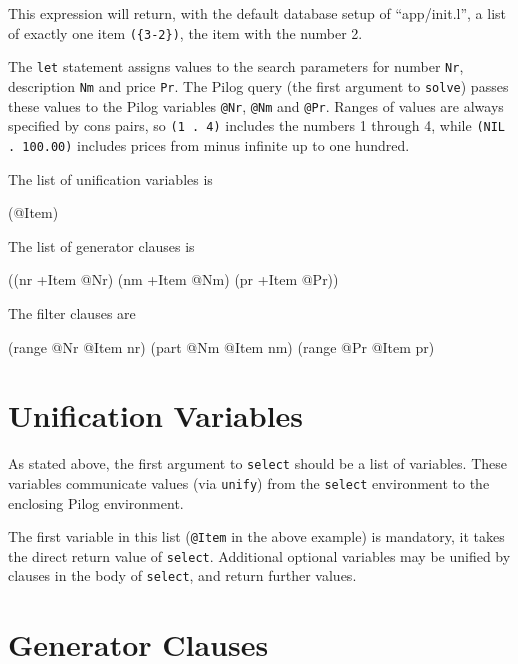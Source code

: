 This expression will return, with the default database setup of
``app/init.l'', a list of exactly one item \texttt{(\{3-2\})}, the item with the
number 2.

The \texttt{let} statement assigns values to the search parameters for number
\texttt{Nr}, description \texttt{Nm} and price \texttt{Pr}. The Pilog query (the first
argument to \texttt{solve}) passes these values to the Pilog variables \texttt{@Nr},
\texttt{@Nm} and \texttt{@Pr}. Ranges of values are always specified by cons pairs, so
\texttt{(1 . 4)} includes the numbers 1 through 4, while \texttt{(NIL . 100.00)}
includes prices from minus infinite up to one hundred.

The list of unification variables is


\begin{wideverbatim}
(@Item)
\end{wideverbatim}

The list of generator clauses is


\begin{wideverbatim}
((nr +Item @Nr) (nm +Item @Nm) (pr +Item @Pr))
\end{wideverbatim}

The filter clauses are


\begin{wideverbatim}
(range @Nr @Item nr)
(part @Nm @Item nm)
(range @Pr @Item pr)
\end{wideverbatim}

 
\section{Unification Variables}
\label{sec:select-pred-unification-variables}


As stated above, the first argument to \texttt{select} should be a list of
variables. These variables communicate values (via \texttt{unify}) from the
\texttt{select} environment to the enclosing Pilog environment.

The first variable in this list (\texttt{@Item} in the above example) is
mandatory, it takes the direct return value of \texttt{select}. Additional
optional variables may be unified by clauses in the body of \texttt{select},
and return further values.

 
\section{Generator Clauses}
\label{sec:select-pred-generator-clauses}


